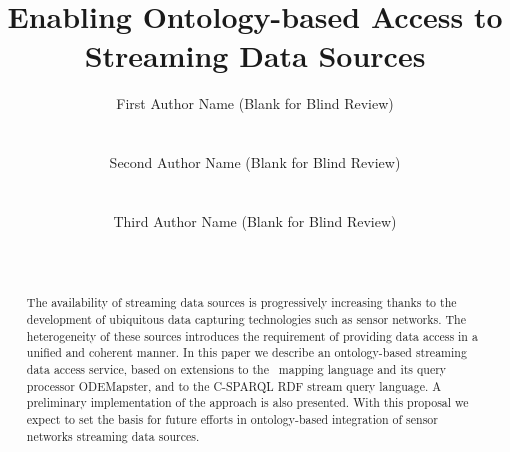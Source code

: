 \documentclass{ubicomp2010}
\newcommand{\subscript}[1]{\ensuremath{_{\textrm{#1}}}}
\newcommand{\gargantuan}{\fontsize{9}{10}\selectfont}
\newcommand{\serifa}[1]{\textsf{\gargantuan{#1}}}
\newcommand{\rtwoo}{\serifa{R\subscript{2}O}}
\begin{document}
\setlength{\paperheight}{11in}
\setlength{\paperwidth}{8.5in}
\setlength{\pdfpageheight}{\paperheight}
\setlength{\pdfpagewidth}{\paperwidth}




\title{Enabling Ontology-based Access to Streaming Data Sources}
\author{
  \alignauthor First Author Name (Blank for Blind Review)\\
    \\
    \\
 \alignauthor Second Author Name (Blank for Blind Review)\\
    \\
    \\
 \alignauthor Third Author Name (Blank for Blind Review)\\
    \\
    \\
      }
\maketitle

\begin{abstract}
The availability of streaming data sources is progressively increasing thanks to the development of ubiquitous data capturing technologies such as sensor networks. The heterogeneity of these sources introduces the requirement of providing data access in a unified and coherent manner. In this paper we describe an ontology-based streaming data access service, based on extensions to the \rtwoo\ mapping language and its query processor ODEMapster, and to the C-SPARQL RDF stream query language. A preliminary implementation of the approach is also presented. With this proposal we expect to set the basis for future efforts in ontology-based integration of sensor networks streaming data sources.
\end{abstract}
\end{document}
